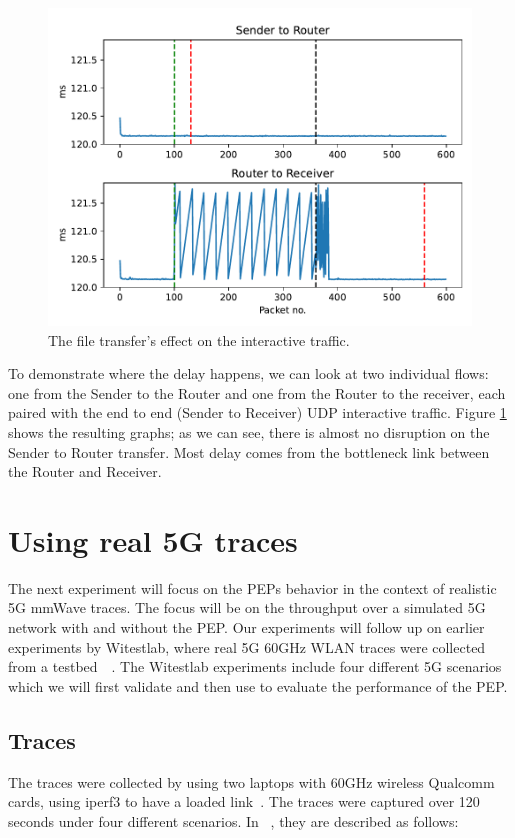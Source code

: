 \documentclass[a4paper,english, 11pt]{report}
\begin{document}
\begin{figure}[h!] %
	\centering
	\includegraphics[scale=0.60]{../diagrams/graphs/compare.pdf}
  	\caption{The file transfer's effect on the interactive traffic.}
  	\label{fig:graph3}
\end{figure}

To demonstrate where the delay happens, we can look at two individual flows: one from the Sender to the Router and one from the Router to the receiver, each paired with the end to end (Sender to Receiver) UDP interactive traffic. Figure \ref{fig:graph3} shows the resulting graphs; as we can see, there is almost no disruption on the Sender to Router transfer. Most delay comes from the bottleneck link between the Router and Receiver.

\section{Using real 5G traces}

The next experiment will focus on the PEPs behavior in the context of realistic 5G mmWave traces. The focus will be on the throughput over a simulated 5G network with and without the PEP. Our experiments will follow up on earlier experiments by Witestlab, where real 5G 60GHz WLAN traces were collected from a testbed~\cite{Srivastava_Fund_Panwar_2020}~\cite{hingane2020aqm}. The Witestlab experiments include four different 5G scenarios which we will first validate and then use to evaluate the performance of the PEP.

\subsection{Traces}
The traces were collected by using two laptops with 60GHz wireless Qualcomm cards, using iperf3 to have a loaded link~\cite{Srivastava_Fund_Panwar_2020}. The traces were captured over 120 seconds under four different scenarios. In ~\cite{Srivastava_Fund_Panwar_2020}, they are described as follows:
\end{document}
